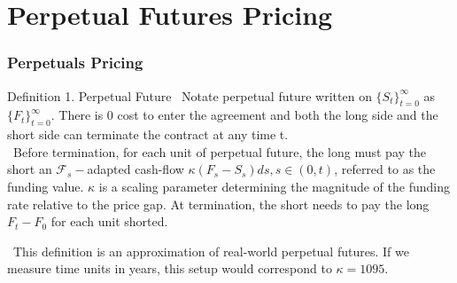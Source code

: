 \documentclass{beamer}
\begin{document}
\section{Perpetual Futures Pricing}

\begin{frame}
\frametitle{Perpetuals Pricing}
\begin{block}{Definition 1. Perpetual Future}
~Notate perpetual future written on $\{S_t\}_{t=0}^\infty$ as $\{F_t\}_{t=0}^\infty$. There is 0 cost to enter the agreement and both the long side and the short side can terminate the contract at any time t. \\~Before termination, for each unit of perpetual future, the long must pay the short an $\mathcal{F}_s-$adapted cash-flow \alert{$\kappa(F_s-S_s)ds $}$,s \in (0, t)$, referred to as the funding value. $\kappa$ is a scaling parameter determining the magnitude of the funding rate relative to the price gap. At termination, the short needs to pay the long \alert{$F_t-F_0$} for each unit shorted.
\end{block}
~This definition is an approximation of real-world perpetual futures. If we measure time units in years, this setup would correspond to $\kappa = 1095$.
\end{frame}
\end{document}

